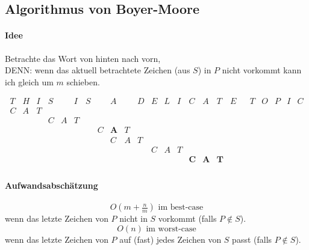 \documentclass[a4paper]{scrartcl}
\begin{document}
\subsection{Algorithmus von Boyer-Moore}

\paragraph{Idee} Betrachte das Wort von hinten nach vorn, \\
	DENN: wenn das aktuell betrachtete Zeichen (aus $S$) in $P$ nicht vorkommt kann ich gleich um $m$ schieben.
	
$$\begin{array}{cccccccccccccccccccccccc}
	T & H & I & S &   & I & S &   & A &  & D & E & L & I & C & A & T & E &  & T & O & P & I & C \\
  C & A & T \\
    &   &   & C & A & T \\
    &   &   &   &   &   &   & C & \textbf{A} & T \\
    &   &   &   &   &   &   &   & C & A & T \\
    &   &   &   &   &   &   &   &   &   &   & C & A & T \\
    &   &   &   &   &   &   &   &   &   &   &   &   &   & \textbf{C} & \textbf{A} & \textbf{T} \\
\end{array}$$

\paragraph{Aufwandsabschätzung}
	$$O\left(m+\tfrac{n}{m}\right) \text{ im best-case}$$
	wenn das letzte Zeichen von $P$ nicht in $S$ vorkommt (falls $P \notin S$).
	$$O(n) \text{ im worst-case}$$
	wenn das letzte Zeichen von $P$ auf (fast) jedes Zeichen von $S$ passt (falls $P \notin S$).
\end{document}
